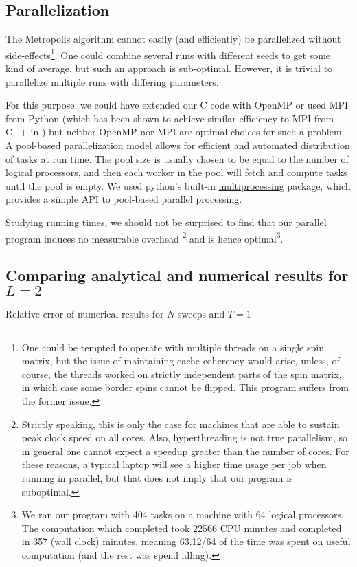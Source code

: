 \documentclass[a4paper]{article}
\begin{document}
\subsection{Parallelization}
The Metropolis algorithm cannot easily (and efficiently) be parallelized without side-effects\footnote{One could be tempted to operate with multiple threads on a single spin matrix, but the issue of maintaining cache coherency would arise, unless, of course, the threads worked on strictly independent parts of the spin matrix, in which case some border spins cannot be flipped.  \href{https://github.com/CompPhysics/ComputationalPhysics/blob/082ee7e/doc/Programs/ParallelizationOpenMP/OpenMPising.cpp}{This program} suffers from the former issue.}. One could combine several runs with different seeds to get some kind of average, but such an approach is sub-optimal. However, it is trivial to parallelize multiple runs with differing parameters.

For this purpose, we could have extended our C code with OpenMP or used MPI from Python (which has been shown to achieve similar efficiency to MPI from C++ in \cite{mortensen_langtangen_hpc_python}) but neither OpenMP nor MPI are optimal choices for such a problem. A pool-based parallelization model allows for efficient and automated distribution of tasks at run time. The pool size is usually chosen to be equal to the number of logical processors, and then each worker in the pool will fetch and compute tasks until the pool is empty. We used python's built-in \href{https://docs.python.org/2/library/multiprocessing.html}{multiprocessing} package, which provides a simple API to pool-based parallel processing.

Studying running times, we should not be surprised to find that our parallel program induces no measurable overhead \footnote{Strictly speaking, this is only the case for machines that are able to sustain peak clock speed on all cores. Also, hyperthreading is not true parallelism, so in general one cannot expect a speedup greater than the number of cores. For these reasons, a typical laptop will see a higher time usage per job when running in parallel, but that does not imply that our program is suboptimal.} and is hence optimal\footnote{We ran our program with 404 tasks on a machine with 64 logical processors. The computation which completed took 22566 CPU minutes and completed in 357 (wall clock) minutes, meaning 63.12/64 of the time was spent on useful computation (and the rest was spend idling).}.

\subsection{Comparing analytical and numerical results for $L=2$}
\begin{table}
    
    \caption{Relative error of numerical results for $N$ sweeps and $T=1$}
    \label{table:b}
\end{table}
\end{document}
